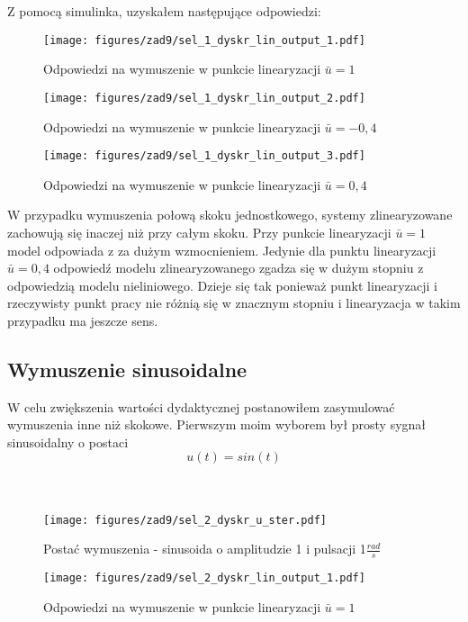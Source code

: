 \documentclass[a4paper,titlepage,11pt,floatssmall]{mwrep}
\begin{document}
Z pomocą simulinka, uzyskałem następujące odpowiedzi:

\begin{figure}[H]
\centering
\texttt{[image: figures/zad9/sel\_1\_dyskr\_lin\_output\_1.pdf]}
\caption{Odpowiedzi na wymuszenie w punkcie linearyzacji $\bar{u} = 1$}
\end{figure}

\begin{figure}[H]
\centering
\texttt{[image: figures/zad9/sel\_1\_dyskr\_lin\_output\_2.pdf]}
\caption{Odpowiedzi na wymuszenie w punkcie linearyzacji $\bar{u} = -0,4$}
\end{figure}

\begin{figure}[H]
\centering
\texttt{[image: figures/zad9/sel\_1\_dyskr\_lin\_output\_3.pdf]}
\caption{Odpowiedzi na wymuszenie w punkcie linearyzacji $\bar{u} = 0,4$}
\end{figure}
\newpage
W przypadku wymuszenia połową skoku jednostkowego, systemy zlinearyzowane zachowują się inaczej niż przy całym skoku. 
Przy punkcie linearyzacji $\bar{u} = 1$ model odpowiada z za dużym wzmocnieniem. Jedynie dla punktu linearyzacji $\bar{u} = 0,4$ odpowiedź modelu zlinearyzowanego zgadza się w dużym stopniu z odpowiedzią modelu nieliniowego. Dzieje się tak ponieważ punkt linearyzacji i rzeczywisty punkt pracy nie różnią się w znacznym stopniu i linearyzacja w takim przypadku ma jeszcze sens.


\subsection{Wymuszenie sinusoidalne}
W celu zwiększenia wartości dydaktycznej postanowiłem zasymulować wymuszenia inne niż skokowe. Pierwszym moim wyborem był prosty sygnał sinusoidalny o postaci
\begin{equation*}
u(t) = sin(t)
\end{equation*}
\\ \\
\begin{figure}[H]
\centering
\texttt{[image: figures/zad9/sel\_2\_dyskr\_u\_ster.pdf]}
\caption{Postać wymuszenia - sinusoida o amplitudzie 1 i pulsacji 1$\frac{rad}{s}$}
\end{figure}
\bigskip
\newpage
\begin{figure}[H]
\centering
\texttt{[image: figures/zad9/sel\_2\_dyskr\_lin\_output\_1.pdf]}
\caption{Odpowiedzi na wymuszenie w punkcie linearyzacji $\bar{u} = 1$}
\end{figure}
\end{document}
